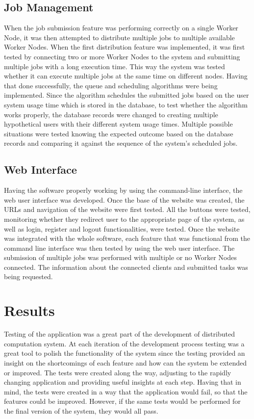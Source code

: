 \documentclass[10pt]{report}
\begin{document}
\subsection*{Job Management}
When the job submission feature was performing correctly on a single Worker Node, it was then attempted to distribute multiple jobs to multiple available Worker Nodes. When the first distribution feature was implemented, it was first tested by connecting two or more Worker Nodes to the system and submitting multiple jobs with a long execution time. This way the system was tested whether it can execute multiple jobs at the same time on different nodes. Having that done successfully, the queue and scheduling algorithms were being implemented. Since the algorithm schedules the submitted jobs based on the user system usage time which is stored in the database, to test whether the algorithm works properly, the database records were changed to creating multiple hypothetical users with their different system usage times. Multiple possible situations were tested knowing the expected outcome based on the database records and comparing it against the sequence of the system's scheduled jobs.

\subsection*{Web Interface}
Having the software properly working by using the command-line interface, the web user interface was developed. Once the base of the website was created, the URLs and navigation of the website were first tested. All the buttons were tested, monitoring whether they redirect user to the appropriate page of the system, as well as login, register and logout functionalities, were tested. Once the website was integrated with the whole software, each feature that was functional from the command line interface was then tested by using the web user interface. The submission of multiple jobs was performed with multiple or no Worker Nodes connected. The information about the connected clients and submitted tasks was being requested.

\section{Results}
Testing of the application was a great part of the development of distributed computation system. At each iteration of the development process testing was a great tool to polish the functionality of the system since the testing provided an insight on the shortcomings of each feature and how can the system be extended or improved. The tests were created along the way, adjusting to the rapidly changing application and providing useful insights at each step. Having that in mind, the tests were created in a way that the application would fail, so that the features could be improved. However, if the same tests would be performed for the final version of the system, they would all pass.
\end{document}
